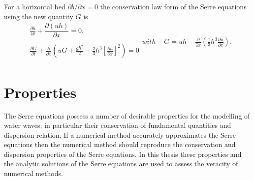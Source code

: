 For a horizontal bed $\partial b / \partial x = 0$ the conservation law form of the Serre equations using the new quantity $G$ is
\begin{subequations}
	\label{eqn:FullSerreConHorizBed}
	\begin{align}
	&\frac{\partial h}{\partial t} + \dfrac{\partial (uh)}{\partial x} = 0, \label{eqn:FullSerreConMassHorizBed} \\  \nonumber \\
	&\frac{\partial G}{\partial t}   + \frac{\partial}{\partial x} \left( {u} G + \frac{gh^2}{2} - \frac{2}{3}h^3 \left[\frac{\partial {u}}{\partial x}\right]^2 \right) = 0 \label{eqn:SerreconsconmomHorizBed}\\ \nonumber 
	\end{align}
	with
	\begin{align}
	&G =  {u}h  - \frac{\partial}{\partial x}\left(\frac{1}{3}h^3  \frac{\partial {u}}{\partial x}\right). \label{defn:SerreEqnConservedQuantity1HorizBed}
	\end{align}
\end{subequations}


\section{Properties}
The Serre equations possess a number of desirable properties for the modelling of water waves; in particular their conservation of fundamental quantities and dispersion relation. If a numerical method accurately approximates the Serre equations then the numerical method should reproduce the conservation and dispersion properties of the Serre equations. In this thesis these properties and the analytic solutions of the Serre equations are used to assess the veracity of numerical methods. 

%

